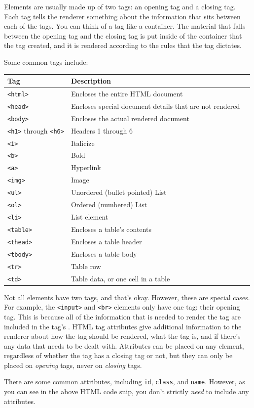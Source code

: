 Elements are usually made up of two tags: an opening tag and a closing tag. Each tag tells the renderer something about the information that sits between each of the tags. You can think of a tag like a container. The material that falls between the opening tag and the closing tag is put inside of the container that the tag created, and it is rendered according to the rules that the tag dictates.\par
Some common tags include:\par
\vspace{5mm}
\begin{tabular}{|l|l|l|}
\hline
Tag & Description              \\
\hline
\verb|<html>| & Encloses the entire HTML document \\
\hline
\verb|<head>| & Encloses special document details that are not rendered \\
\hline
\verb|<body>|  & Encloses the actual rendered document \\
\hline
\verb|<h1>| through \verb|<h6>| & Headers 1 through 6 \\
\hline
\verb|<i>| & Italicize \\
\hline
\verb|<b>| & Bold \\
\hline
\verb|<a>| & Hyperlink \\
\hline
\verb|<img>| & Image \\
\hline
\verb|<ul>| & Unordered (bullet pointed) List \\
\hline
\verb|<ol>| & Ordered (numbered) List \\
\hline
\verb|<li>| & List element \\
\hline
\verb|<table>| & Encloses a table's contents \\
\hline
\verb|<thead>| & Encloses a table header \\
\hline
\verb|<tbody>| & Encloses a table body \\
\hline
\verb|<tr>| & Table row \\
\hline
\verb|<td>| & Table data, or one cell in a table \\
\hline
\end{tabular}\par
\vspace{5mm}
Not all elements have two tags, and that's okay. However, these are special cases. For example, the \verb|<input>| and \verb|<br>| elements only have one tag: their opening tag. This is because all of the information that is needed to render the tag are included in the tag's . HTML tag attributes give additional information to the renderer about how the tag should be rendered, what the tag is, and if there's any data that needs to be dealt with. Attributes can be placed on any element, regardless of whether the tag has a closing tag or not, but they can only be placed on \textit{opening} tags, never on \textit{closing} tags.\par
There are some common attributes, including \verb|id|, \verb|class|, and \verb|name|. However, as you can see in the above HTML code snip, you don't strictly \textit{need} to include any attributes.

